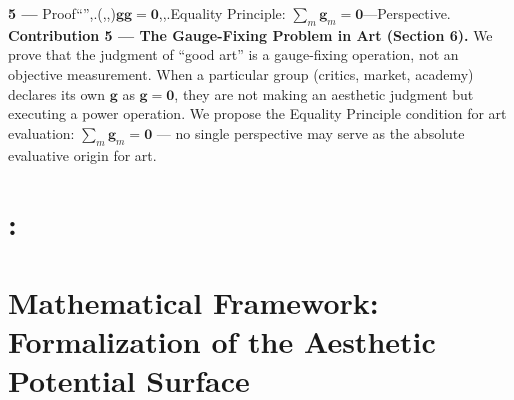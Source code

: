 \documentclass[12pt,a4paper]{article}
\theoremstyle{remark}
\newcommand{\GParam}{\mathbf{g}}
\begin{document}
\medskip
\noindent\textbf{ 5 ---}
Proof``'',.(,,)$\GParam$$\GParam = \mathbf{0}$,,.Equality Principle: $\sum_m \GParam_m = \mathbf{0}$---Perspective.
\textbf{Contribution 5 --- The Gauge-Fixing Problem in Art (Section 6).}
We prove that the judgment of ``good art'' is a gauge-fixing operation, not an objective measurement. When a particular group (critics, market, academy) declares its own $\GParam$ as $\GParam = \mathbf{0}$, they are not making an aesthetic judgment but executing a power operation. We propose the Equality Principle condition for art evaluation: $\sum_m \GParam_m = \mathbf{0}$ --- no single perspective may serve as the absolute evaluative origin for art.
\section{:}
\section{Mathematical Framework: Formalization of the Aesthetic Potential Surface}
\subsection{}
\end{document}
